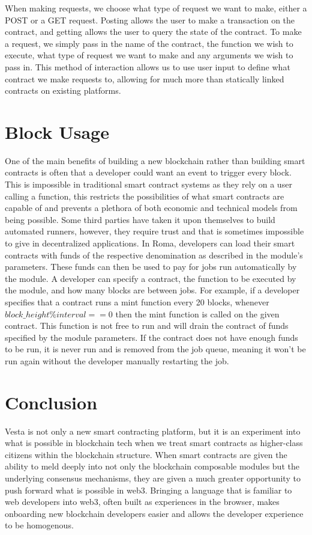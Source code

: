 \documentclass[a4paper]{article}
\begin{document}
When making requests, we choose what type of request we want to make, either a POST or a GET request.
Posting allows the user to make a transaction on the contract, and getting allows the user to query the state of the contract.
To make a request, we simply pass in the name of the contract, the function we wish to execute, what type of request we want to make and any arguments we wish to pass in.
This method of interaction allows us to use user input to define what contract we make requests to, allowing for much more than statically linked contracts on existing platforms.

\section{Block Usage}\label{sec:block-usage}
One of the main benefits of building a new blockchain rather than building smart contracts is often that a developer could want an event to trigger every block.
This is impossible in traditional smart contract systems as they rely on a user calling a function, this restricts the possibilities of what smart contracts are capable of and prevents a plethora of both economic and technical models from being possible.
Some third parties have taken it upon themselves to build automated runners, however, they require trust and that is sometimes impossible to give in decentralized applications.\cite{croncat}
In Roma, developers can load their smart contracts with funds of the respective denomination as described in the module's parameters.
These funds can then be used to pay for jobs run automatically by the module.
A developer can specify a contract, the function to be executed by the module, and how many blocks are between jobs.
For example, if a developer specifies that a contract runs a mint function every 20 blocks, whenever $block\_height \% interval == 0$ then the mint function is called on the given contract.
This function is not free to run and will drain the contract of funds specified by the module parameters.
If the contract does not have enough funds to be run, it is never run and is removed from the job queue, meaning it won't be run again without the developer manually restarting the job.

\section{Conclusion}\label{sec:conclusion}
Vesta is not only a new smart contracting platform, but it is an experiment into what is possible in blockchain tech when we treat smart contracts as higher-class citizens within the blockchain structure.
When smart contracts are given the ability to meld deeply into not only the blockchain composable modules but the underlying consensus mechanisms, they are given a much greater opportunity to push forward what is possible in web3.
Bringing a language that is familiar to web developers into web3, often built as experiences in the browser, makes onboarding new blockchain developers easier and allows the developer experience to be homogenous.

\newpage
\printbibliography
\end{document}
